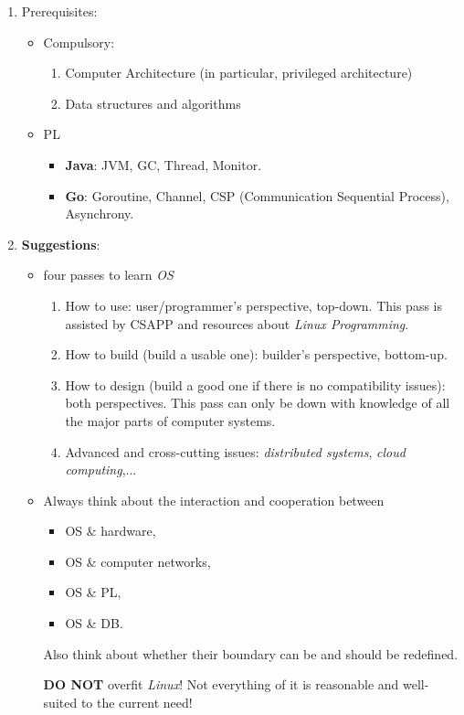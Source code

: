 \documentclass{article}
\begin{document}
\begin{enumerate}
    \item Prerequisites:
    \begin{itemize}
        \item Compulsory:
        \begin{enumerate}
        \item Computer Architecture (in particular, privileged architecture)
        \item Data structures and algorithms
        \end{enumerate}
        \item PL
        \begin{itemize}
        \item \textbf{Java}: JVM, GC, Thread, Monitor.
        \item \textbf{Go}: Goroutine, Channel, CSP (Communication Sequential Process), Asynchrony.
        \end{itemize}
    \end{itemize}
    \item \textbf{Suggestions}:
    \begin{itemize}
        \item four passes to learn \emph{OS}
            \begin{enumerate}
                \item How to use: user/programmer's perspective, top-down.
                This pass is assisted by CSAPP and resources about \emph{Linux Programming}.
                \item How to build (build a usable one): builder's perspective, bottom-up.
                \item How to design (build a good one if there is no compatibility issues): both perspectives.
                This pass can only be down with knowledge of all the major parts of computer systems.
                \item Advanced and cross-cutting issues:
                \emph{distributed systems}, \emph{cloud computing},...
            \end{enumerate}
        \item Always think about the interaction and cooperation between
        \begin{itemize}
            \item OS \& hardware,
            \item OS \& computer networks,
            \item OS \& PL,
            \item OS \& DB.
        \end{itemize}
        Also think about whether their boundary can be and should be redefined.
        
        \textbf{DO NOT} overfit \emph{Linux}!
        Not everything of it is reasonable and well-suited to the current need!
    \end{itemize}

\end{enumerate}
\end{document}
